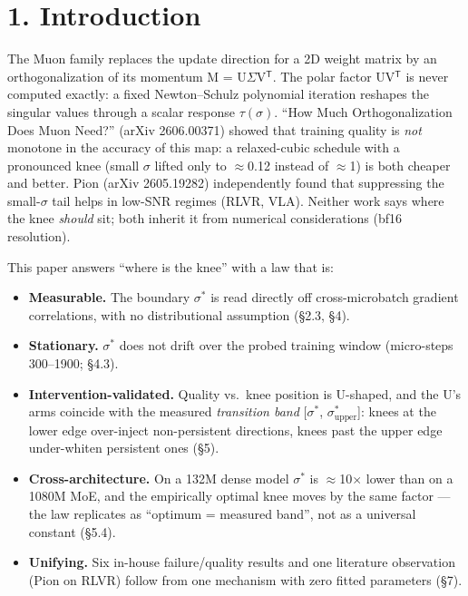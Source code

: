 \documentclass[
]{article}
\providecommand{\tightlist}{%
  \setlength{\itemsep}{0pt}\setlength{\parskip}{0pt}}
\begin{document}
\section{1. Introduction}\label{introduction}

The Muon family replaces the update direction for a 2D weight matrix by
an orthogonalization of its momentum M =
U\(\Sigma\){}V\(^{\mathsf{T}}\). The polar factor UV\(^{\mathsf{T}}\)
is never computed exactly: a fixed Newton--Schulz polynomial iteration
reshapes the singular values through a scalar response \(\tau(\sigma)\).
``How Much Orthogonalization Does Muon Need?'' (arXiv 2606.00371) showed
that training quality is \emph{not} monotone in the accuracy of this
map: a relaxed-cubic schedule with a pronounced knee (small \(\sigma\)
lifted only to \(\approx\){}0.12 instead of \(\approx\){}1) is both
cheaper and better. Pion (arXiv 2605.19282) independently found that
suppressing the small-\(\sigma\) tail helps in low-SNR regimes (RLVR,
VLA). Neither work says where the knee \emph{should} sit; both inherit
it from numerical considerations (bf16 resolution).

This paper answers ``where is the knee'' with a law that is:

\begin{itemize}
\tightlist
\item
  \textbf{Measurable.} The boundary \(\sigma^*\) is read directly off
  cross-microbatch gradient correlations, with no distributional
  assumption (§2.3, §4).
\item
  \textbf{Stationary.} \(\sigma^*\) does not drift over the probed
  training window (micro-steps 300--1900; §4.3).
\item
  \textbf{Intervention-validated.} Quality vs.~knee position is
  U-shaped, and the U's arms coincide with the measured \emph{transition
  band} {[}\(\sigma^*\), \(\sigma^*_{\mathrm{upper}}\){]}: knees at the
  lower edge over-inject non-persistent directions, knees past the upper
  edge under-whiten persistent ones (§5).
\item
  \textbf{Cross-architecture.} On a 132M dense model \(\sigma^*\) is
  \(\approx\){}10\(\times\) lower than on a 1080M MoE, and the
  empirically optimal knee moves by the same factor --- the law
  replicates as ``optimum = measured band'', not as a universal constant
  (§5.4).
\item
  \textbf{Unifying.} Six in-house failure/quality results and one
  literature observation (Pion on RLVR) follow from one mechanism with
  zero fitted parameters (§7).
\end{itemize}
\end{document}

